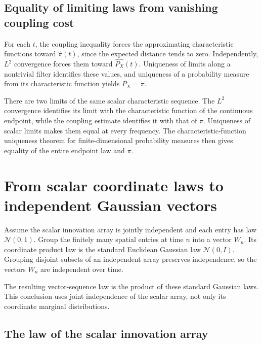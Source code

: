 \documentclass[11pt,a4paper]{article}
\begin{document}
\subsection{\texorpdfstring{Equality of limiting laws from vanishing coupling cost}{Equality of limiting laws from vanishing coupling cost}}


For each \(t\), the coupling inequality forces the approximating characteristic functions toward \(\widehat\pi(t)\), since the expected distance tends to zero. Independently, \(L^2\) convergence forces them toward \(\widehat{P_X}(t)\). Uniqueness of limits along a nontrivial filter identifies these values, and uniqueness of a probability measure from its characteristic function yields \(P_X=\pi\).



There are two limits of the same scalar characteristic sequence. The \(L^2\) convergence identifies its limit with the characteristic function of the continuous endpoint, while the coupling estimate identifies it with that of \(\pi\). Uniqueness of scalar limits makes them equal at every frequency. The characteristic-function uniqueness theorem for finite-dimensional probability measures then gives equality of the entire endpoint law and \(\pi\).


\section{\texorpdfstring{From scalar coordinate laws to independent Gaussian vectors}{From scalar coordinate laws to independent Gaussian vectors}}


Assume the scalar innovation array is jointly independent and each entry has law \(\mathcal N(0,1)\). Group the finitely many spatial entries at time \(n\) into a vector \(W_n\). Its coordinate product law is the standard Euclidean Gaussian law \(\mathcal N(0,I)\). Grouping disjoint subsets of an independent array preserves independence, so the vectors \(W_n\) are independent over time.



The resulting vector-sequence law is the product of these standard Gaussian laws. This conclusion uses joint independence of the scalar array, not only its coordinate marginal distributions.


\subsection{\texorpdfstring{The law of the scalar innovation array}{The law of the scalar innovation array}}
\end{document}
